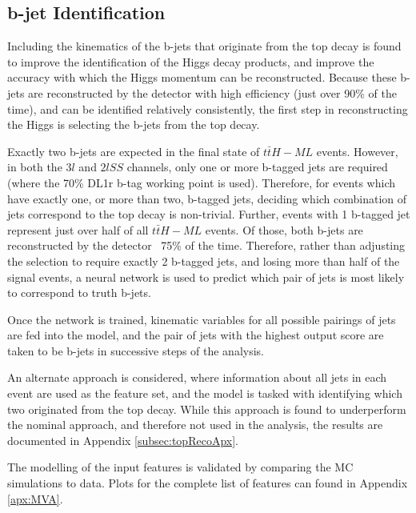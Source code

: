 \subsection{b-jet Identification}
\label{sec:bjetID}

Including the kinematics of the b-jets that originate from the top decay is found to improve the identification of the Higgs decay products, and improve the accuracy with which the Higgs momentum can be reconstructed. Because these b-jets are reconstructed by the detector with high efficiency (just over 90\% of the time), and can be identified relatively consistently, the first step in reconstructing the Higgs is selecting the b-jets from the top decay.

Exactly two b-jets are expected in the final state of $t\bar{t}H-ML$ events. However, in both the $3l$  and $2lSS$ channels, only one or more b-tagged jets are required (where the 70\% DL1r b-tag working point is used). Therefore, for events which have exactly one, or more than two, b-tagged jets, deciding which combination of jets correspond to the top decay is non-trivial. Further, events with 1 b-tagged jet represent just over half of all $t\bar{t}H-ML$ events. Of those, both b-jets are reconstructed by the detector ~75\% of the time. Therefore, rather than adjusting the selection to require exactly 2 b-tagged jets, and losing more than half of the signal events, a neural network is used to predict which pair of jets is most likely to correspond to truth b-jets.

Once the network is trained, kinematic variables for all possible pairings of jets are fed into the model, and the pair of jets with the highest output score are taken to be b-jets in successive steps of the analysis. 

An alternate approach is considered, where information about all jets in each event are used as the feature set, and the model is tasked with identifying which two originated from the top decay. While this approach is found to underperform the nominal approach, and therefore not used in the analysis, the results are documented in Appendix \ref{subsec:topRecoApx}.

The modelling of the input features is validated by comparing the MC simulations to data. Plots for the complete list of features can found in Appendix \ref{apx:MVA}.

